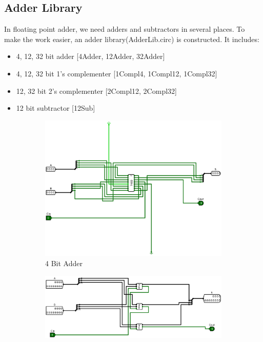 \documentclass[12pt]{article}
\begin{document}
\subsection{Adder Library}
In floating point adder, we need adders and subtractors in several places. To make the work easier, an adder library(AdderLib.circ) is constructed. It includes:
\begin{itemize}
    \item 4, 12, 32 bit adder [4Adder, 12Adder, 32Adder]
    \item 4, 12, 32 bit 1's complementer [1Compl4, 1Compl12, 1Compl32]
    \item 12, 32 bit 2's complementer [2Compl12, 2Compl32]
    \item 12 bit subtractor [12Sub]
\end{itemize}
\begin{figure}[H]
    \centering
    \begin{subfigure}[b]{0.3\textwidth}
        \includegraphics[width=\textwidth]{Images/4Adder.png}
        \caption{4 Bit Adder}
        \label{fig:4bitadder}
    \end{subfigure}
    \begin{subfigure}[b]{0.3\textwidth}
        \includegraphics[width=\textwidth]{Images/12Adder.png}

\end{subfigure}
\end{figure}
\end{document}
